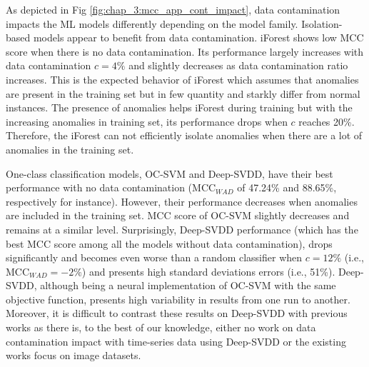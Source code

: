 As depicted in Fig \ref{fig:chap_3:mcc_app_cont_impact}, data contamination impacts the ML models differently depending on the model family. Isolation-based models appear to benefit from data contamination. iForest shows low MCC score when there is no data contamination. Its performance largely increases with data contamination $c=4\%$ and slightly decreases as data contamination ratio increases. This is the expected behavior of iForest which assumes that anomalies are present in the training set but in few quantity and starkly differ from normal instances. The presence of anomalies helps iForest during training but with the increasing anomalies in training set, its performance drops when $c$ reaches 20\%. Therefore, the iForest can not efficiently isolate anomalies when there are a lot of anomalies in the training set.

One-class classification models, OC-SVM and Deep-SVDD, have their best performance with no data contamination (MCC$_{WAD}$ of 47.24\% and 88.65\%, respectively for instance). However, their performance decreases when anomalies are included in the training set. MCC score of OC-SVM slightly decreases and remains at a similar level. Surprisingly, Deep-SVDD performance (which has the best MCC score among all the models without data contamination), drops significantly and becomes even worse than a random classifier when $c=12\%$ (i.e., MCC$_{WAD} =-2\%$) and presents high standard deviations errors (i.e., 51\%). 
Deep-SVDD, although being a neural implementation of OC-SVM with the same objective function, presents high variability in results from one run to another. Moreover, it is difficult to contrast these results on Deep-SVDD with previous works as there is, to the best of our knowledge, either no work on data contamination impact with time-series data using Deep-SVDD or the existing works focus on image datasets. %


